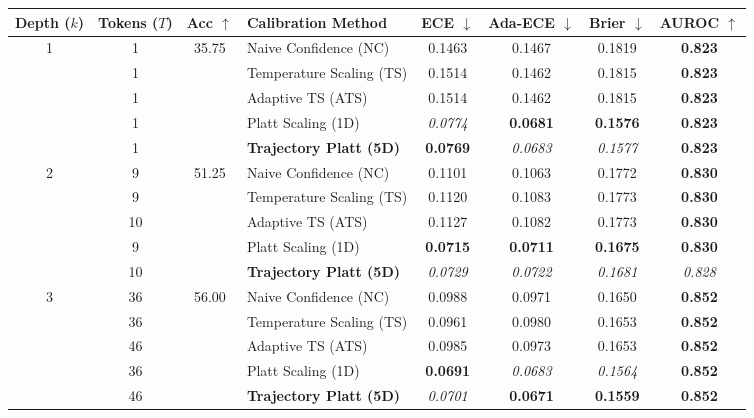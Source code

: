 \begin{table}[t]
\setlength{\tabcolsep}{4pt}
\renewcommand{\arraystretch}{1.05}
\centering
\footnotesize
\begin{tabular}{ccclcccc}
\toprule
\textbf{Depth ($k$)} & \textbf{Tokens ($T$)} & \textbf{Acc} $\uparrow$ & \textbf{Calibration Method} & \textbf{ECE} $\downarrow$ & \textbf{Ada-ECE} $\downarrow$ & \textbf{Brier} $\downarrow$ & \textbf{AUROC} $\uparrow$ \\
\midrule
\multirow{5}{*}{1} & 1 & \multirow{5}{*}{35.75} & Naive Confidence (NC) & 0.1463 & 0.1467 & 0.1819 & \textbf{0.823} \\
 & 1 &  & Temperature Scaling (TS) & 0.1514 & 0.1462 & 0.1815 & \textbf{0.823} \\
 & 1 &  & Adaptive TS (ATS) & 0.1514 & 0.1462 & 0.1815 & \textbf{0.823} \\
 & 1 &  & Platt Scaling (1D) & \textit{0.0774} & \textbf{0.0681} & \textbf{0.1576} & \textbf{0.823} \\
 & 1 &  & \textbf{Trajectory Platt (5D)} & \textbf{0.0769} & \textit{0.0683} & \textit{0.1577} & \textbf{0.823} \\
\midrule
\multirow{5}{*}{2} & 9 & \multirow{5}{*}{51.25} & Naive Confidence (NC) & 0.1101 & 0.1063 & 0.1772 & \textbf{0.830} \\
 & 9 &  & Temperature Scaling (TS) & 0.1120 & 0.1083 & 0.1773 & \textbf{0.830} \\
 & 10 &  & Adaptive TS (ATS) & 0.1127 & 0.1082 & 0.1773 & \textbf{0.830} \\
 & 9 &  & Platt Scaling (1D) & \textbf{0.0715} & \textbf{0.0711} & \textbf{0.1675} & \textbf{0.830} \\
 & 10 &  & \textbf{Trajectory Platt (5D)} & \textit{0.0729} & \textit{0.0722} & \textit{0.1681} & \textit{0.828} \\
\midrule
\multirow{5}{*}{3} & 36 & \multirow{5}{*}{56.00} & Naive Confidence (NC) & 0.0988 & 0.0971 & 0.1650 & \textbf{0.852} \\
 & 36 &  & Temperature Scaling (TS) & 0.0961 & 0.0980 & 0.1653 & \textbf{0.852} \\
 & 46 &  & Adaptive TS (ATS) & 0.0985 & 0.0973 & 0.1653 & \textbf{0.852} \\
 & 36 &  & Platt Scaling (1D) & \textbf{0.0691} & \textit{0.0683} & \textit{0.1564} & \textbf{0.852} \\
 & 46 &  & \textbf{Trajectory Platt (5D)} & \textit{0.0701} & \textbf{0.0671} & \textbf{0.1559} & \textbf{0.852} \\
\midrule

\end{tabular}
\end{table}
